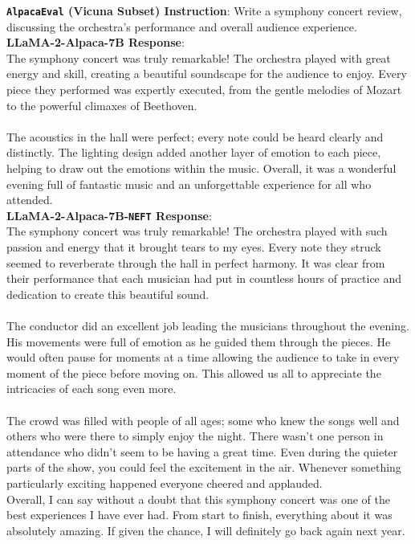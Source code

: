 \documentclass{article} %
\newcommand{\neft}{\texttt{NEFT}}
\newcommand{\llama}{LLaMA}
\begin{document}
\begin{tcolorbox}[breakable,boxrule=0pt]
  \textbf{\texttt{AlpacaEval} (Vicuna Subset) Instruction}: Write a symphony concert review, discussing the orchestra's performance and overall audience experience.\\
  \textbf{\llama{}-2-Alpaca-7B Response}: \\The symphony concert was truly remarkable! The orchestra played with great energy and skill, creating a beautiful soundscape for the audience to enjoy. Every piece they performed was expertly executed, from the gentle melodies of Mozart to the powerful climaxes of Beethoven. \\\\The acoustics in the hall were perfect; every note could be heard clearly and distinctly. The lighting design added another layer of emotion to each piece, helping to draw out the emotions within the music. Overall, it was a wonderful evening full of fantastic music and an unforgettable experience for all who attended.\\
  \textbf{\llama{}-2-Alpaca-7B-\neft{} Response}:\\The symphony concert was truly remarkable! The orchestra played with such passion and energy that it brought tears to my eyes. Every note they struck seemed to reverberate through the hall in perfect harmony. It was clear from their performance that each musician had put in countless hours of practice and dedication to create this beautiful sound. \\\\The conductor did an excellent job leading the musicians throughout the evening. His movements were full of emotion as he guided them through the pieces. He would often pause for moments at a time allowing the audience to take in every moment of the piece before moving on. This allowed us all to appreciate the intricacies of each song even more. \\\\The crowd was filled with people of all ages; some who knew the songs well and others who were there to simply enjoy the night. There wasn't one person in attendance who didn't seem to be having a great time. Even during the quieter parts of the show, you could feel the excitement in the air. Whenever something particularly exciting happened everyone cheered and applauded. \\Overall, I can say without a doubt that this symphony concert was one of the best experiences I have ever had. From start to finish, everything about it was absolutely amazing. If given the chance, I will definitely go back again next year. \\

\end{tcolorbox}
\end{document}
